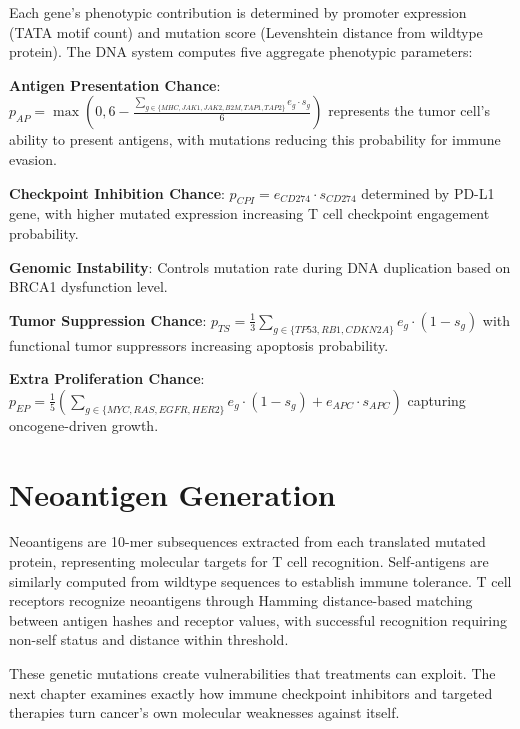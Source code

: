 Each gene's phenotypic contribution is determined by promoter expression (TATA motif count) and mutation score (Levenshtein distance from wildtype protein). The DNA system computes five aggregate phenotypic parameters:

\textbf{Antigen Presentation Chance}: $p_{AP} = \max(0, 6 - \frac{\sum_{g \in \{MHC,JAK1,JAK2,B2M,TAP1,TAP2\}} e_g \cdot s_g}{6})$ represents the tumor cell's ability to present antigens, with mutations reducing this probability for immune evasion.

\textbf{Checkpoint Inhibition Chance}: $p_{CPI} = e_{CD274} \cdot s_{CD274}$ determined by PD-L1 gene, with higher mutated expression increasing T cell checkpoint engagement probability.

\textbf{Genomic Instability}: Controls mutation rate during DNA duplication based on BRCA1 dysfunction level.

\textbf{Tumor Suppression Chance}: $p_{TS} = \frac{1}{3}\sum_{g \in \{TP53,RB1,CDKN2A\}} e_g \cdot (1-s_g)$ with functional tumor suppressors increasing apoptosis probability.

\textbf{Extra Proliferation Chance}: $p_{EP} = \frac{1}{5}(\sum_{g \in \{MYC,RAS,EGFR,HER2\}} e_g \cdot (1-s_g) + e_{APC} \cdot s_{APC})$ capturing oncogene-driven growth.

\section{Neoantigen Generation}
\label{sec:neoantigens}

Neoantigens are 10-mer subsequences extracted from each translated mutated protein, representing molecular targets for T cell recognition. Self-antigens are similarly computed from wildtype sequences to establish immune tolerance. T cell receptors recognize neoantigens through Hamming distance-based matching between antigen hashes and receptor values, with successful recognition requiring non-self status and distance within threshold.

These genetic mutations create vulnerabilities that treatments can exploit. The next chapter examines exactly how immune checkpoint inhibitors and targeted therapies turn cancer's own molecular weaknesses against itself.